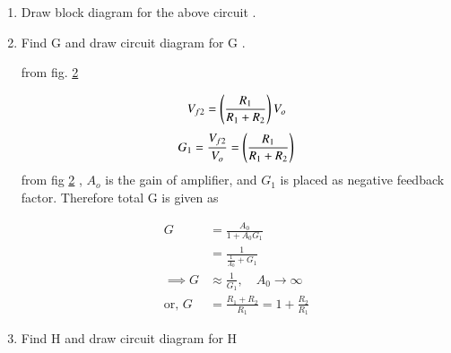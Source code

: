 \begin{enumerate}[label=\arabic*.,ref=\theenumi]

\item Draw block diagram for the above circuit .
\\
\solution  
\begin{figure}[!ht]
	\begin{center}
		\resizebox{\columnwidth}{!}{}
	\end{center}
\caption{}
\label{fig:ee18btech11049_block}
\end{figure}

\item Find G and draw circuit diagram for G .  
\\
\solution  
\begin{figure}[!ht]
	\begin{center}
		\resizebox{\columnwidth}{!}{}
	\end{center}
\caption{}
\label{fig:ee18btech11049_g_block}
\end{figure}

from fig. \ref{fig:ee18btech11049_g_block} 

\begin{align}
    V_{f2} = \left(\frac{R_1}{R_1 + R_2}\right)V_o
\end{align}
\begin{align}
    G_1 = \frac{V_{f2}}{V_o} = \left(\frac{R_1}{R_1 + R_2}\right)
\end{align}
from fig \ref{fig:ee18btech11049_g_block} , $A_o$ is the gain of amplifier, and $G_1$ is placed as negative feedback factor. Therefore total G is given as

\begin{align}
G &= \frac{A_{0}}{1+A_{0}G_{1}}
\\
&= \frac{1}{\frac{1}{A_{0}} + G_{1}}
\\
\implies G&\approx \frac{1}{G_{1}}, \quad   A_{0}\to\infty
\\
\text{or, } G &= \frac{R_{1}+R_{2}}{R_{1}}=1+\frac{R_{2}}{R_{1}}
\label{eq:ee18btech11049_G}
\end{align}


\item  Find H and draw circuit diagram for H
\\
\solution  


\end{enumerate}
